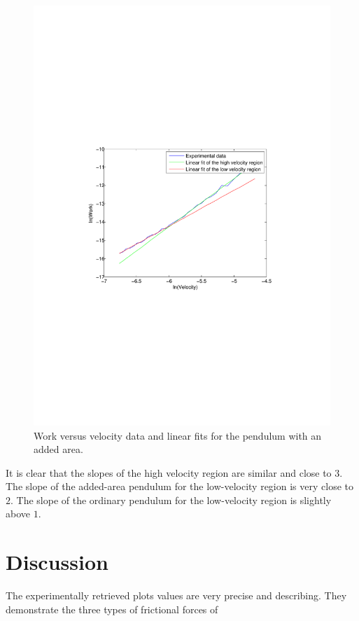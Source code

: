\documentclass[11pt, a4paper]{article}
\begin{document}
\begin{figure}[h]
	\centering
	\includegraphics[trim=10.0cm 10.0cm 10.0cm 10.0cm, scale=0.7]{paper}
	\caption{Work versus velocity data and  linear fits for the pendulum with an added area.}
	\label{f:paper}
\end{figure}

It is clear that the slopes of the high velocity region are similar and close to $3$. 
The slope of the added-area pendulum for the low-velocity region is very close to $2$.
The slope of the ordinary pendulum for the low-velocity region is slightly above $1$.



\section{Discussion}
The experimentally retrieved plots values are very precise and describing. They demonstrate the three types of frictional forces of 
\end{document}
